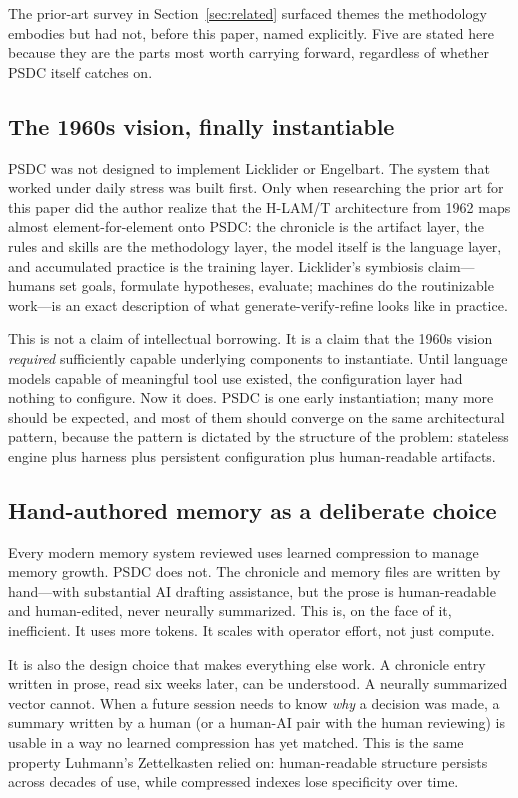 \documentclass[12pt]{article}
\begin{document}
The prior-art survey in Section~\ref{sec:related} surfaced themes the methodology embodies but had not, before this paper, named explicitly. Five are stated here because they are the parts most worth carrying forward, regardless of whether PSDC itself catches on.

\subsection{The 1960s vision, finally instantiable}
\label{subsec:lineage}

PSDC was not designed to implement Licklider or Engelbart. The system that worked under daily stress was built first. Only when researching the prior art for this paper did the author realize that the H-LAM/T architecture from 1962 maps almost element-for-element onto PSDC: the chronicle is the artifact layer, the rules and skills are the methodology layer, the model itself is the language layer, and accumulated practice is the training layer. Licklider's symbiosis claim---humans set goals, formulate hypotheses, evaluate; machines do the routinizable work---is an exact description of what generate-verify-refine looks like in practice.

This is not a claim of intellectual borrowing. It is a claim that the 1960s vision \emph{required} sufficiently capable underlying components to instantiate. Until language models capable of meaningful tool use existed, the configuration layer had nothing to configure. Now it does. PSDC is one early instantiation; many more should be expected, and most of them should converge on the same architectural pattern, because the pattern is dictated by the structure of the problem: stateless engine plus harness plus persistent configuration plus human-readable artifacts.

\subsection{Hand-authored memory as a deliberate choice}
\label{subsec:zettelkasten}

Every modern memory system reviewed uses learned compression to manage memory growth. PSDC does not. The chronicle and memory files are written by hand---with substantial AI drafting assistance, but the prose is human-readable and human-edited, never neurally summarized. This is, on the face of it, inefficient. It uses more tokens. It scales with operator effort, not just compute.

It is also the design choice that makes everything else work. A chronicle entry written in prose, read six weeks later, can be understood. A neurally summarized vector cannot. When a future session needs to know \emph{why} a decision was made, a summary written by a human (or a human-AI pair with the human reviewing) is usable in a way no learned compression has yet matched. This is the same property Luhmann's Zettelkasten relied on: human-readable structure persists across decades of use, while compressed indexes lose specificity over time.
\end{document}

